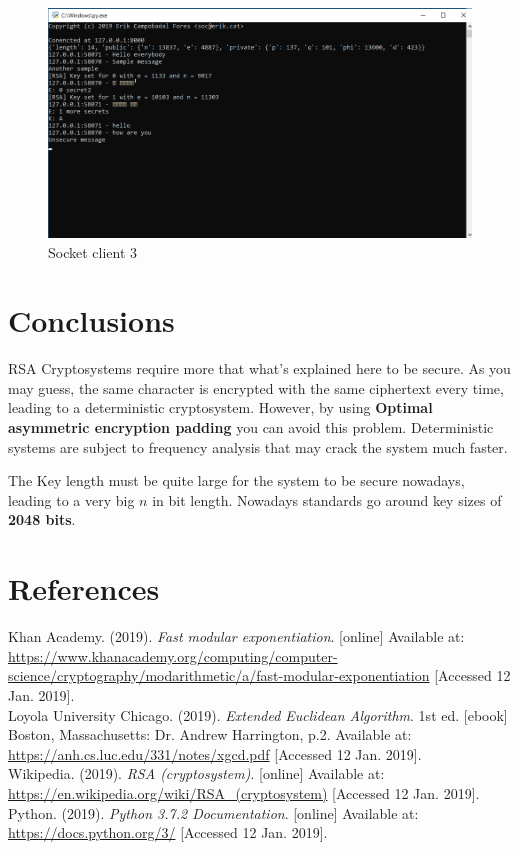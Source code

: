 \documentclass[usenames,dvipsnames,12pt]{report}
\begin{document}
\begin{figure}[H]
    \centering
    \includegraphics[width=15cm]{RSA5}
    \caption{Socket client 3}
\end{figure}

\chapter{Conclusions}

RSA Cryptosystems require more that what's explained here to be secure. As you may guess, the
same character is encrypted with the same ciphertext every time, leading to a deterministic cryptosystem.
However, by using \textbf{Optimal asymmetric encryption padding} you can avoid this problem. Deterministic systems
are subject to frequency analysis that may crack the system much faster.

The Key length must be quite large for the system to be secure nowadays, leading to a very big $n$ in bit length.
Nowadays standards go around key sizes of \textbf{2048 bits}.

\chapter{References}

Khan Academy. (2019). \textit{Fast modular exponentiation}.
[online] Available at:
\url{https://www.khanacademy.org/computing/computer-science/cryptography/modarithmetic/a/fast-modular-exponentiation}
[Accessed 12 Jan. 2019].\\

Loyola University Chicago. (2019). \textit{Extended Euclidean Algorithm}. 1st ed.
[ebook] Boston, Massachusetts: Dr. Andrew Harrington, p.2. Available at:
\url{https://anh.cs.luc.edu/331/notes/xgcd.pdf}
[Accessed 12 Jan. 2019].\\

Wikipedia. (2019). \textit{RSA (cryptosystem)}.
[online] Available at:
\url{https://en.wikipedia.org/wiki/RSA_(cryptosystem)}
[Accessed 12 Jan. 2019].\\

Python. (2019). \textit{Python 3.7.2 Documentation}.
[online] Available at:
\url{https://docs.python.org/3/}
[Accessed 12 Jan. 2019].
\end{document}
